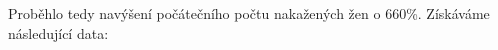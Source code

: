 \documentclass{article}
\begin{document}
Proběhlo tedy navýšení počátečního počtu nakažených žen o 660\%. Získáváme následující data:
\begin{figure}[h]
    \centering
    \qquad
\end{figure}
\begin{figure}[h]
    \centering
    \qquad
\end{figure}
\end{document}
